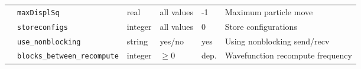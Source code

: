 \begin{table}[h]
\begin{center}
\begin{tabularx}{\textwidth}{l l l l l X }
   &   \texttt{maxDisplSq      } &  real  & all values & -1   & Maximum particle move  \\
   &   \texttt{storeconfigs        } &  integer  & all values & 0   & Store configurations  \\
   &   \texttt{use\_nonblocking    } &  string  & yes/no & yes   & Using nonblocking send/recv \\
   &   \texttt{blocks\_between\_recompute} &  integer  & $\ge 0$ & dep.  & Wavefunction recompute frequency  \\
  \hline
\end{tabularx}
\end{center}
\end{table}

